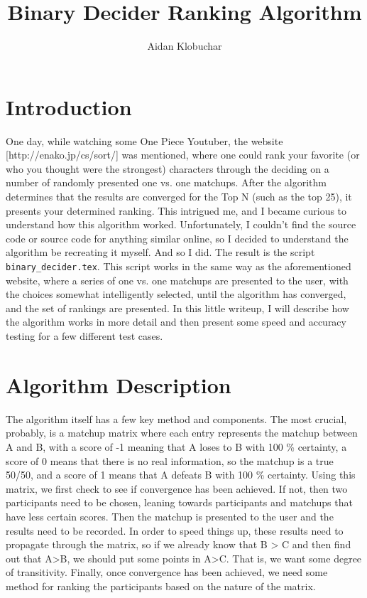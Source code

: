 \documentclass[11pt]{article}
\title{Binary Decider Ranking Algorithm}
\author{Aidan Klobuchar}
\date{}
\begin{document}
\maketitle
\section{Introduction}
\noindent One day, while watching some One Piece Youtuber, the website \href{http://enako.jp/cs/sort/}[http://enako.jp/cs/sort/] was mentioned, where one could rank your favorite (or who you thought were the strongest) characters through the deciding on a number of randomly presented one vs. one matchups. After the algorithm determines that the results are converged for the Top N (such as the top 25), it presents your determined ranking. This intrigued me, and I became curious to understand how this algorithm worked. Unfortunately, I couldn't find the source code or source code for anything similar online, so I decided to understand the algorithm be recreating it myself. And so I did. The result is the script \texttt{binary\_decider.tex}. This script works in the same way as the aforementioned website, where a series of one vs. one matchups are presented to the user, with the choices somewhat intelligently selected, until the algorithm has converged, and the set of rankings are presented. In this little writeup, I will describe how the algorithm works in more detail and then present some speed and accuracy testing for a few different test cases.

\section{Algorithm Description}
\noindent The algorithm itself has a few key method and components. The most crucial, probably, is a matchup matrix where each entry represents the matchup between A and B, with a score of -1 meaning that A loses to B with 100 \% certainty, a score of 0 means that there is no real information, so the matchup is a true 50/50, and a score of 1 means that A defeats B with 100 \% certainty. Using this matrix, we first check to see if convergence has been achieved. If not, then two participants need to be chosen, leaning towards participants and matchups that have less certain scores. Then the matchup is presented to the user and the results need to be recorded. In order to speed things up, these results need to propagate through the matrix, so if we already know that B > C and then find out that A>B, we should put some points in A>C. That is, we want some degree of transitivity. Finally, once convergence has been achieved, we need some method for ranking the participants based on the nature of the matrix. 
\end{document}
